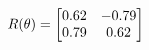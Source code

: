 \documentclass[preview]{standalone}
\begin{document}
\begin{align*}
\special{dvisvgm:raw <g id='unique000'>}R(\theta) = \begin{bmatrix}0.62 & -0.79\\0.79 & 0.62\end{bmatrix}\special{dvisvgm:raw </g>}
\end{align*}
\end{document}
